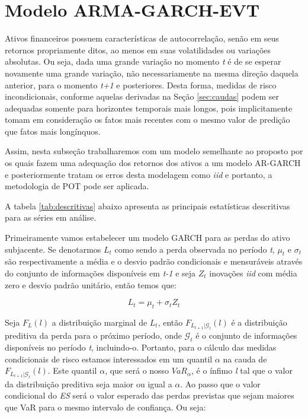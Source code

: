 \documentclass[review]{elsarticle}
\theoremstyle{definition}
\begin{document}
\section{Modelo ARMA-GARCH-EVT}
\label{sec:armagarchevt}

Ativos financeiros possuem características de autocorrelação, senão em seus retornos propriamente ditos, ao menos em suas volatilidades ou variações absolutas. Ou seja, dada uma grande variação no momento \emph{t} é de se esperar novamente uma grande variação, não necessariamente na mesma direção daquela anterior, para o momento \emph{t+1} e posteriores. Desta forma, medidas de risco incondicionais, conforme aquelas derivadas na Seção \ref{sec:caudas} podem ser adequadas somente para horizontes temporais mais longos, pois implicitamente tomam em consideração os fatos mais recentes com o mesmo valor de predição que fatos mais longínquos.

Assim, nesta subseção trabalharemos com um modelo semelhante ao proposto por \cite{McNeil2000} os quais fazem uma adequação dos retornos dos ativos a um modelo AR-GARCH e posteriormente tratam os erros desta modelagem como \emph{iid} e portanto, a metodologia de POT pode ser aplicada.

A tabela \ref{tab:descritivas} abaixo apresenta as principais estatísticas descritivas para as séries em análise.



Primeiramente vamos estabelecer um modelo GARCH para as perdas do ativo subjacente. Se denotarmos $L_t$ como sendo a perda observada no período \emph{t}, $\mu_t$ e $\sigma_t$ são respectivamente a média e o desvio padrão condicionais e mensuráveis através do conjunto de informações disponíveis em \emph{t-1} e seja $Z_t$ inovações \emph{iid} com média zero e desvio padrão unitário, então temos que:

\begin{equation}
\label{eq:loss}
L_t=\mu_t+\sigma_t Z_t
\end{equation}

Seja $F_L(l)$ a distribuição marginal de $L_t$, então $F_{L_{t+1} | \mathcal{G}_t}(l)$ é a distribuição preditiva da perda para o próximo período, onde $\mathcal{G}_t$ é o conjunto de informações disponíveis no período \emph{t}, incluindo-o. Portanto, para o cálculo das medidas condicionais de risco estamos interessados em um quantil $\alpha$ na cauda de $F_{L_{t+1} | \mathcal{G}_t}(l)$. Este quantil $\alpha$, que será o nosso $VaR_\alpha$, é o ínfimo \emph{l} tal que o valor da distribuição preditiva seja maior ou igual a $\alpha$. Ao passo que o valor condicional do \emph{ES} será o valor esperado das perdas previstas que sejam maiores que VaR para o mesmo intervalo de confiança. Ou seja:
\end{document}
